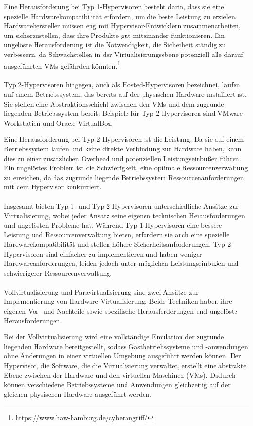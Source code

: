 Eine Herausforderung bei Typ 1-Hypervisoren besteht darin, dass sie eine spezielle Hardwarekompatibilität erfordern, um die beste Leistung zu erzielen. Hardwarehersteller müssen eng mit Hypervisor-Entwicklern zusammenarbeiten, um sicherzustellen, dass ihre Produkte gut miteinander funktionieren. Ein ungelöste Herausforderung ist die Notwendigkeit, die Sicherheit ständig zu verbessern, da Schwachstellen in der Virtualisierungsebene potenziell alle darauf ausgeführten VMs gefährden könnten.\footnote{\url{https://www.haw-hamburg.de/cyberangriff/}}
\\\\
Typ 2-Hypervisoren hingegen, auch als Hosted-Hypervisoren bezeichnet, laufen auf einem Betriebssystem, das bereits auf der physischen Hardware installiert ist. Sie stellen eine Abstraktionsschicht zwischen den VMs und dem zugrunde liegenden Betriebssystem bereit. Beispiele für Typ 2-Hypervisoren sind VMware Workstation und Oracle VirtualBox.

Eine Herausforderung bei Typ 2-Hypervisoren ist die Leistung. Da sie auf einem Betriebssystem laufen und keine direkte Verbindung zur Hardware haben, kann dies zu einer zusätzlichen Overhead und potenziellen Leistungseinbußen führen. Ein ungelöstes Problem ist die Schwierigkeit, eine optimale Ressourcenverwaltung zu erreichen, da das zugrunde liegende Betriebssystem Ressourcenanforderungen mit dem Hypervisor konkurriert.
\\\\
Insgesamt bieten Typ 1- und Typ 2-Hypervisoren unterschiedliche Ansätze zur Virtualisierung, wobei jeder Ansatz seine eigenen technischen Herausforderungen und ungelösten Probleme hat. Während Typ 1-Hypervisoren eine bessere Leistung und Ressourcenverwaltung bieten, erfordern sie auch eine spezielle Hardwarekompatibilität und stellen höhere Sicherheitsanforderungen. Typ 2-Hypervisoren sind einfacher zu implementieren und haben weniger Hardwareanforderungen, leiden jedoch unter möglichen Leistungseinbußen und schwierigerer Ressourcenverwaltung.
\\\\
Vollvirtualisierung und Paravirtualisierung sind zwei Ansätze zur Implementierung von Hardware-Virtualisierung. Beide Techniken haben ihre eigenen Vor- und Nachteile sowie spezifische Herausforderungen und ungelöste Herausforderungen.

Bei der Vollvirtualisierung wird eine vollständige Emulation der zugrunde liegenden Hardware bereitgestellt, sodass Gastbetriebssysteme und -anwendungen ohne Änderungen in einer virtuellen Umgebung ausgeführt werden können. Der Hypervisor, die Software, die die Virtualisierung verwaltet, erstellt eine abstrakte Ebene zwischen der Hardware und den virtuellen Maschinen (VMs). Dadurch können verschiedene Betriebssysteme und Anwendungen gleichzeitig auf der gleichen physischen Hardware ausgeführt werden.

